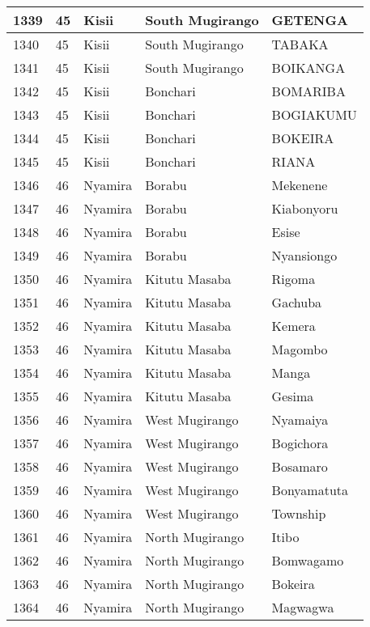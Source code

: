 \begin{table}[!ht]
\begin{tabular}{|l|l|l|l|l|}
        1339 & 45 & Kisii & South Mugirango & GETENGA \\ \hline
        1340 & 45 & Kisii & South Mugirango & TABAKA \\ \hline
        1341 & 45 & Kisii & South Mugirango & BOIKANGA \\ \hline
        1342 & 45 & Kisii & Bonchari & BOMARIBA \\ \hline
        1343 & 45 & Kisii & Bonchari & BOGIAKUMU \\ \hline
        1344 & 45 & Kisii & Bonchari & BOKEIRA \\ \hline
        1345 & 45 & Kisii & Bonchari & RIANA \\ \hline
        1346 & 46 & Nyamira & Borabu & Mekenene \\ \hline
        1347 & 46 & Nyamira & Borabu & Kiabonyoru \\ \hline
        1348 & 46 & Nyamira & Borabu & Esise \\ \hline
        1349 & 46 & Nyamira & Borabu & Nyansiongo \\ \hline
        1350 & 46 & Nyamira & Kitutu Masaba & Rigoma \\ \hline
        1351 & 46 & Nyamira & Kitutu Masaba & Gachuba \\ \hline
        1352 & 46 & Nyamira & Kitutu Masaba & Kemera \\ \hline
        1353 & 46 & Nyamira & Kitutu Masaba & Magombo \\ \hline
        1354 & 46 & Nyamira & Kitutu Masaba & Manga \\ \hline
        1355 & 46 & Nyamira & Kitutu Masaba & Gesima \\ \hline
        1356 & 46 & Nyamira & West Mugirango & Nyamaiya \\ \hline
        1357 & 46 & Nyamira & West Mugirango & Bogichora \\ \hline
        1358 & 46 & Nyamira & West Mugirango & Bosamaro \\ \hline
        1359 & 46 & Nyamira & West Mugirango & Bonyamatuta \\ \hline
        1360 & 46 & Nyamira & West Mugirango & Township \\ \hline
        1361 & 46 & Nyamira & North Mugirango & Itibo \\ \hline
        1362 & 46 & Nyamira & North Mugirango & Bomwagamo \\ \hline
        1363 & 46 & Nyamira & North Mugirango & Bokeira \\ \hline
        1364 & 46 & Nyamira & North Mugirango & Magwagwa \\ \hline

\end{tabular}
\end{table}
